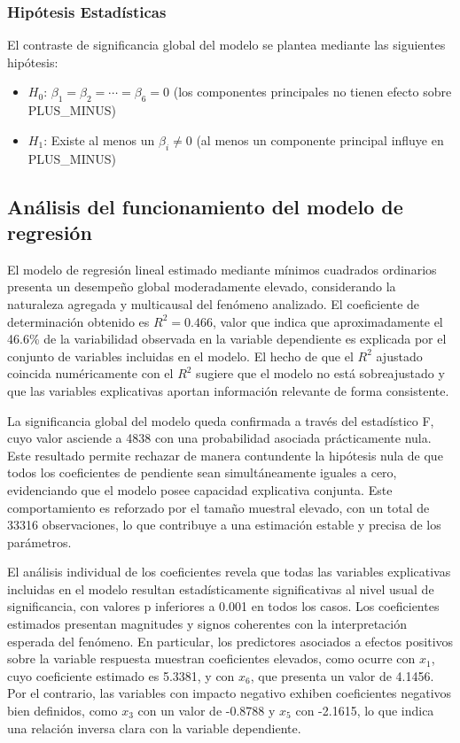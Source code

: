\documentclass[12pt]{article}
\begin{document}
\subsubsection{Hipótesis Estadísticas}
\label{subsubsec:hipotesis-estadisticas}

El contraste de significancia global del modelo se plantea mediante las siguientes hipótesis:
\begin{itemize}
    \item $H_0$: $\beta_1 = \beta_2 = \cdots = \beta_6 = 0$ (los componentes principales no tienen efecto sobre PLUS\_MINUS)
    \item $H_1$: Existe al menos un $\beta_i \neq 0$ (al menos un componente principal influye en PLUS\_MINUS)
\end{itemize}




\subsection{Análisis del funcionamiento del modelo de regresión}

El modelo de regresión lineal estimado mediante mínimos cuadrados ordinarios presenta un desempeño global moderadamente elevado, considerando la naturaleza agregada y multicausal del fenómeno analizado. El coeficiente de determinación obtenido es $R^2 = 0.466$, valor que indica que aproximadamente el 46.6\% de la variabilidad observada en la variable dependiente es explicada por el conjunto de variables incluidas en el modelo. El hecho de que el $R^2$ ajustado coincida numéricamente con el $R^2$ sugiere que el modelo no está sobreajustado y que las variables explicativas aportan información relevante de forma consistente.


La significancia global del modelo queda confirmada a través del estadístico F, cuyo valor asciende a 4838 con una probabilidad asociada prácticamente nula. Este resultado permite rechazar de manera contundente la hipótesis nula de que todos los coeficientes de pendiente sean simultáneamente iguales a cero, evidenciando que el modelo posee capacidad explicativa conjunta. Este comportamiento es reforzado por el tamaño muestral elevado, con un total de 33316 observaciones, lo que contribuye a una estimación estable y precisa de los parámetros.

El análisis individual de los coeficientes revela que todas las variables explicativas incluidas en el modelo resultan estadísticamente significativas al nivel usual de significancia, con valores p inferiores a 0.001 en todos los casos. Los coeficientes estimados presentan magnitudes y signos coherentes con la interpretación esperada del fenómeno. En particular, los predictores asociados a efectos positivos sobre la variable respuesta muestran coeficientes elevados, como ocurre con $x_1$, cuyo coeficiente estimado es 5.3381, y con $x_6$, que presenta un valor de 4.1456. Por el contrario, las variables con impacto negativo exhiben coeficientes negativos bien definidos, como $x_3$ con un valor de -0.8788 y $x_5$ con -2.1615, lo que indica una relación inversa clara con la variable dependiente.
\end{document}
